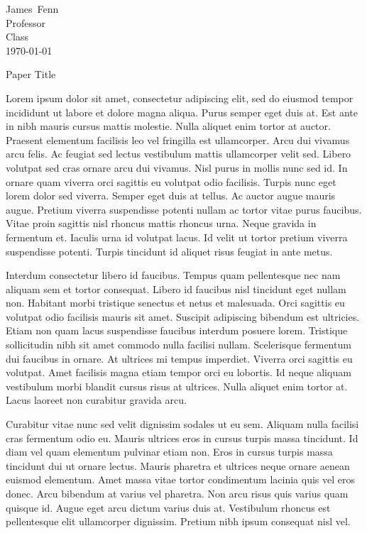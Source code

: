 \documentclass[12pt]{article}
\newcommand{\papertitle}{Paper Title}
\newcommand{\authorfirst}{James}
\newcommand{\authorlast}{Fenn}
\newcommand{\paperclass}{Class}
\newcommand{\paperprof}{Professor}
\begin{document}
\begin{flushleft}

\authorfirst~\authorlast\\
\paperprof\\
\paperclass\\
\today\\

\begin{center}
\papertitle
\end{center}

\setlength{\parindent}{0.5in}

Lorem ipsum dolor sit amet, consectetur adipiscing elit, sed do eiusmod tempor incididunt ut labore
et dolore magna aliqua. Purus semper eget duis at. Est ante in nibh mauris cursus mattis molestie.
Nulla aliquet enim tortor at auctor. Praesent elementum facilisis leo vel fringilla est ullamcorper.
Arcu dui vivamus arcu felis. Ac feugiat sed lectus vestibulum mattis ullamcorper velit sed. Libero
volutpat sed cras ornare arcu dui vivamus. Nisl purus in mollis nunc sed id. In ornare quam viverra
orci sagittis eu volutpat odio facilisis. Turpis nunc eget lorem dolor sed viverra. Semper eget duis
at tellus. Ac auctor augue mauris augue. Pretium viverra suspendisse potenti nullam ac tortor vitae
purus faucibus. Vitae proin sagittis nisl rhoncus mattis rhoncus urna. Neque gravida in fermentum
et. Iaculis urna id volutpat lacus. Id velit ut tortor pretium viverra suspendisse potenti. Turpis
tincidunt id aliquet risus feugiat in ante metus.\footnotemark

Interdum consectetur libero id faucibus. Tempus quam pellentesque nec nam aliquam sem et tortor
consequat. Libero id faucibus nisl tincidunt eget nullam non. Habitant morbi tristique senectus et
netus et malesuada. Orci sagittis eu volutpat odio facilisis mauris sit amet. Suscipit adipiscing
bibendum est ultricies. Etiam non quam lacus suspendisse faucibus interdum posuere lorem. Tristique
sollicitudin nibh sit amet commodo nulla facilisi nullam. Scelerisque fermentum dui faucibus in
ornare. At ultrices mi tempus imperdiet. Viverra orci sagittis eu volutpat. Amet facilisis magna
etiam tempor orci eu lobortis. Id neque aliquam vestibulum morbi blandit cursus risus at ultrices.
Nulla aliquet enim tortor at. Lacus laoreet non curabitur gravida arcu.

Curabitur vitae nunc sed velit dignissim sodales ut eu sem. Aliquam nulla facilisi cras fermentum
odio eu. Mauris ultrices eros in cursus turpis massa tincidunt. Id diam vel quam elementum pulvinar
etiam non. Eros in cursus turpis massa tincidunt dui ut ornare lectus. Mauris pharetra et ultrices
neque ornare aenean euismod elementum. Amet massa vitae tortor condimentum lacinia quis vel eros
donec. Arcu bibendum at varius vel pharetra. Non arcu risus quis varius quam quisque id. Augue eget
arcu dictum varius duis at. Vestibulum rhoncus est pellentesque elit ullamcorper dignissim. Pretium
nibh ipsum consequat nisl vel.
\newpage



\end{flushleft}
\end{document}
